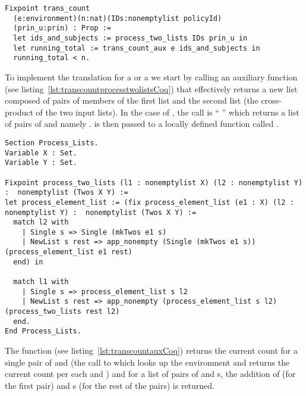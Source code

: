 \begin{minipage}[c]{0.95\textwidth}
\begin{lstlisting}
Fixpoint trans_count
  (e:environment)(n:nat)(IDs:nonemptylist policyId)
  (prin_u:prin) : Prop :=
  let ids_and_subjects := process_two_lists IDs prin_u in
  let running_total := trans_count_aux e ids_and_subjects in
  running_total < n.
\end{lstlisting}
\end{minipage}


To implement the translation for a  or a  we start by calling an auxiliary function  (see listing~\ref{lst:transcountprocesstwolistsCoq}) that effectively returns a new list composed of pairs of members of the first list and the second list (the cross-product of the two input lists). In the case of , the call is ``  '' which returns a list of pairs of  and  namely .  is then passed to a locally defined function called .

\begin{lstlisting}
Section Process_Lists.
Variable X : Set.
Variable Y : Set.

Fixpoint process_two_lists (l1 : nonemptylist X) (l2 : nonemptylist Y) :  nonemptylist (Twos X Y) :=
let process_element_list := (fix process_element_list (e1 : X) (l2 : nonemptylist Y) :	nonemptylist (Twos X Y) :=
  match l2 with
    | Single s => Single (mkTwos e1 s)
    | NewList s rest => app_nonempty (Single (mkTwos e1 s)) (process_element_list e1 rest)
  end) in

  match l1 with
    | Single s => process_element_list s l2
    | NewList s rest => app_nonempty (process_element_list s l2) (process_two_lists rest l2)
  end.
End Process_Lists.
\end{lstlisting}


The function  (see listing~\ref{lst:transcountauxCoq}) returns the current count for a single pair of  and  (the call to  which looks up the environment  and returns the current count per each  and ) and for a list of pairs of  and s, the addition of  (for the first pair) and s (for the rest of the pairs) is returned. 

